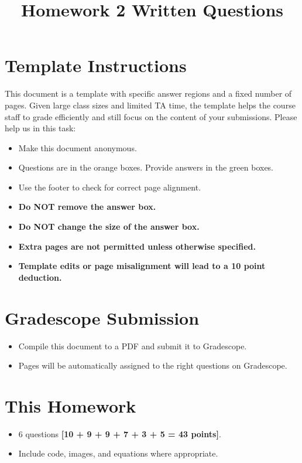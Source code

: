 \documentclass[11pt]{article}
\date{}
\title{\vspace{-1cm}Homework 2 Written Questions}
\begin{document}
\maketitle
\thispagestyle{fancy}

\section*{Template Instructions}

This document is a template with specific answer regions and a fixed number of pages. Given large class sizes and limited TA time, the template helps the course staff to grade efficiently and still focus on the content of your submissions. Please help us in this task:
 
\begin{itemize}
  \item Make this document anonymous.
  
  \item Questions are in the orange boxes. Provide answers in the green boxes.
  \item Use the footer to check for correct page alignment.

  \item \textbf{Do NOT remove the answer box.}
  \item \textbf{Do NOT change the size of the answer box.}
  \item \textbf{Extra pages are not permitted unless otherwise specified.}
  \item \textbf{Template edits or page misalignment will lead to a 10 point deduction.}
\end{itemize}

\section*{Gradescope Submission}
\begin{itemize}
  \item Compile this document to a PDF and submit it to Gradescope.
  \item Pages will be automatically assigned to the right questions on Gradescope.
\end{itemize}

\section*{This Homework}
\begin{itemize}
    \item 6 questions \textbf{[10 + 9 + 9 + 7 + 3 + 5 = 43 points]}.
    \item Include code, images, and equations where appropriate.
\end{itemize}
\end{document}
